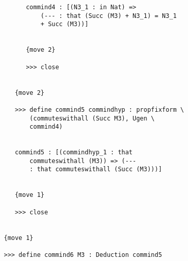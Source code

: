 \documentclass[12pt]{article}
\begin{document}
\begin{verbatim}
         commind4 : [(N3_1 : in Nat) => 
             (--- : that (Succ (M3) + N3_1) = N3_1 
             + Succ (M3))]


         {move 2}

         >>> close


      {move 2}

      >>> define commind5 commindhyp : propfixform \
          (commuteswithall (Succ M3), Ugen \
          commind4)


      commind5 : [(commindhyp_1 : that 
          commuteswithall (M3)) => (--- 
          : that commuteswithall (Succ (M3)))]


      {move 1}

      >>> close


   {move 1}

   >>> define commind6 M3 : Deduction commind5



\end{verbatim}
\end{document}
